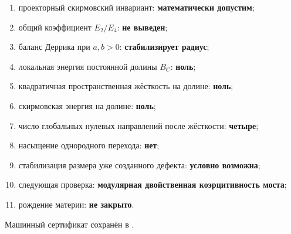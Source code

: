 \begin{protocol}
\begin{enumerate}
 \item проекторный скирмовский инвариант:
 \textbf{математически допустим};
 \item общий коэффициент $E_2/E_4$:
 \textbf{не выведен};
 \item баланс Деррика при $a,b>0$:
 \textbf{стабилизирует радиус};
 \item локальная энергия постоянной долины $B_C$:
 \textbf{ноль};
 \item квадратичная пространственная жёсткость на долине:
 \textbf{ноль};
 \item скирмовская энергия на долине:
 \textbf{ноль};
 \item число глобальных нулевых направлений после жёсткости:
 \textbf{четыре};
 \item насыщение однородного перехода:
 \textbf{нет};
 \item стабилизация размера уже созданного дефекта:
 \textbf{условно возможна};
 \item следующая проверка:
 \textbf{модулярная двойственная коэрцитивность моста};
 \item рождение материи:
 \textbf{не закрыто}.
\end{enumerate}
\end{protocol}

Машинный сертификат сохранён в
.